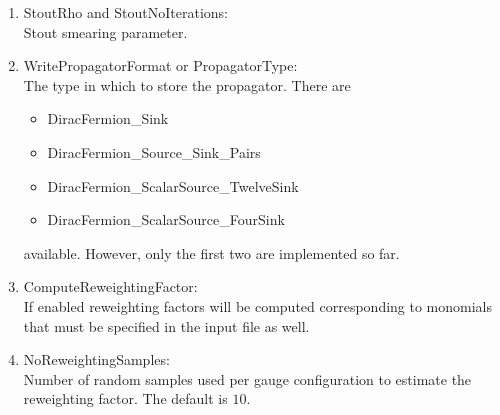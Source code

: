 \begin{enumerate}
\item {\ttfamily StoutRho} and {\ttfamily StoutNoIterations}:\\
  Stout smearing parameter.

\item {\ttfamily WritePropagatorFormat} or {\ttfamily PropagatorType}:\\
  The type in which to store the propagator. There are 
  \begin{itemize}
  \item {\ttfamily DiracFermion\_Sink}
  \item {\ttfamily DiracFermion\_Source\_Sink\_Pairs}
  \item {\ttfamily DiracFermion\_ScalarSource\_TwelveSink}
  \item {\ttfamily DiracFermion\_ScalarSource\_FourSink}
  \end{itemize}
  available. However, only the first two are implemented so far.

\item {\ttfamily ComputeReweightingFactor}:\\
  If enabled reweighting factors will be computed corresponding to
  monomials that must be specified in the input file as well.

\item {\ttfamily NoReweightingSamples}:\\
  Number of random samples used per gauge configuration to estimate
  the reweighting factor. The default is $10$.

\end{enumerate}



